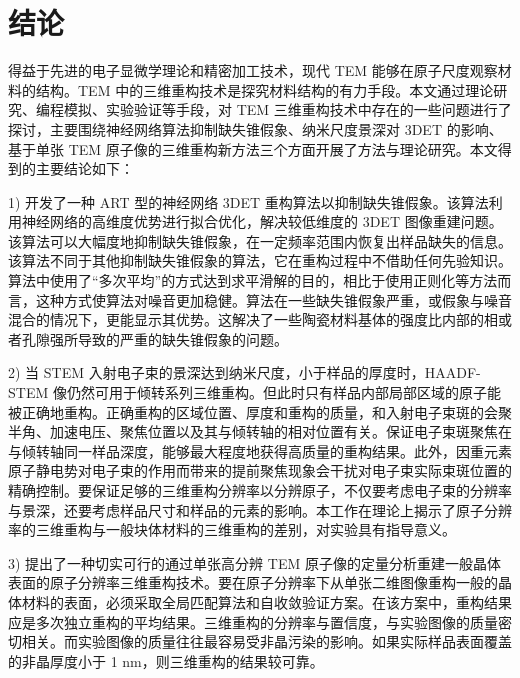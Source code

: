\clearemptydoublepage
{} %
\chapter*{结\quad 论}

得益于先进的电子显微学理论和精密加工技术，现代 TEM 能够在原子尺度观察材料的结构。TEM 中的三维重构技术是探究材料结构的有力手段。本文通过理论研究、编程模拟、实验验证等手段，对 TEM 三维重构技术中存在的一些问题进行了探讨，主要围绕神经网络算法抑制缺失锥假象、纳米尺度景深对 3DET 的影响、基于单张 TEM 原子像的三维重构新方法三个方面开展了方法与理论研究。本文得到的主要结论如下：



1) 开发了一种 ART 型的神经网络 3DET 重构算法以抑制缺失锥假象。该算法利用神经网络的高维度优势进行拟合优化，解决较低维度的 3DET 图像重建问题。该算法可以大幅度地抑制缺失锥假象，在一定频率范围内恢复出样品缺失的信息。该算法不同于其他抑制缺失锥假象的算法，它在重构过程中不借助任何先验知识。算法中使用了“多次平均”的方式达到求平滑解的目的，相比于使用正则化等方法而言，这种方式使算法对噪音更加稳健。算法在一些缺失锥假象严重，或假象与噪音混合的情况下，更能显示其优势。这解决了一些陶瓷材料基体的强度比内部的相或者孔隙强所导致的严重的缺失锥假象的问题。

2) 当 STEM 入射电子束的景深达到纳米尺度，小于样品的厚度时，HAADF-STEM 像仍然可用于倾转系列三维重构。但此时只有样品内部局部区域的原子能被正确地重构。正确重构的区域位置、厚度和重构的质量，和入射电子束斑的会聚半角、加速电压、聚焦位置以及其与倾转轴的相对位置有关。保证电子束斑聚焦在与倾转轴同一样品深度，能够最大程度地获得高质量的重构结果。此外，因重元素原子静电势对电子束的作用而带来的提前聚焦现象会干扰对电子束实际束斑位置的精确控制。要保证足够的三维重构分辨率以分辨原子，不仅要考虑电子束的分辨率与景深，还要考虑样品尺寸和样品的元素的影响。本工作在理论上揭示了原子分辨率的三维重构与一般块体材料的三维重构的差别，对实验具有指导意义。

3) 提出了一种切实可行的通过单张高分辨 TEM 原子像的定量分析重建一般晶体表面的原子分辨率三维重构技术。要在原子分辨率下从单张二维图像重构一般的晶体材料的表面，必须采取全局匹配算法和自收敛验证方案。在该方案中，重构结果应是多次独立重构的平均结果。三维重构的分辨率与置信度，与实验图像的质量密切相关。而实验图像的质量往往最容易受非晶污染的影响。如果实际样品表面覆盖的非晶厚度小于 1 nm，则三维重构的结果较可靠。

\quad

\quad


\noindent {}


